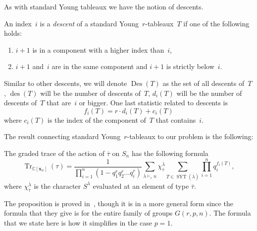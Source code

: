 \documentclass[ALCO,ThmDefs,Unicode,epreuves]{cedram}
\DeclareMathOperator{\Des}{Des}
\DeclareMathOperator{\des}{des}
\DeclareMathOperator{\SYT}{SYT}
\DeclareMathOperator{\Tr}{Tr}
\begin{document}
	As with standard Young tableaux we have the notion of descents.

	\begin{defi}

		An index~$i$ is a \emph{descent} of a standard Young~$r$-tableaux~$T$ if one of the following holds:

		\begin{enumerate}
			
			\item $i+1$ is in a component with a higher index than~$i$,

			\item $i+1$ and~$i$ are in the same component and $i+1$ is strictly below~$i$.

		\end{enumerate}
		
		Similar to other descents, we will denote $\Des (T)$ as the set of all descents of~$T$, $\des (T)$ will be the number of 
descents of~$T$, $d_i(T)$ will be the number of descents of~$T$ that are~$i$ or bigger. One last statistic related 
to descents is
\begin{equation}
f_i(T)=r\cdot d_i(T)+c_i(T)
\end{equation}
 where $c_i(T)$ is the index of the component of~$T$ that contains~$i$. 
	\end{defi}

The result connecting standard Young~$r$-tableaux to our problem is the following:

	\begin{prop}
	\label{BBProp}
		The graded trace of the action of $\overline{\tau}$ on $S_n$ has the following formula 
		\begin{equation}
		\Tr _{\mathbb{C}[\mathbf{x}_n]}(\tau)=\frac{1}{\prod_{i=1}^n(1-q_1^rq_2^r\ldots 
q_i^r)}\sum_{\overline{\lambda}\vdash_r n}\chi_{\overline{\tau}}^{\overline{\lambda}}\sum_{T\in 
\SYT (\overline{\lambda})}\prod_{i=1}^{n} q_i^{f_i(T)},
\end{equation}
		where $\chi_{\overline{\tau}}^{\overline{\lambda}}$ is the character $S^{\overline{\lambda}}$ evaluated at an element 
of type $\overline{\tau}$.

	\end{prop}

The proposition is proved in~\cite{BB}, though it is in a more general form since the formula that they give is for the entire 
family of groups $G(r,p,n)$. The formula that we state here is how it simplifies in the case $p=1$.
\end{document}
